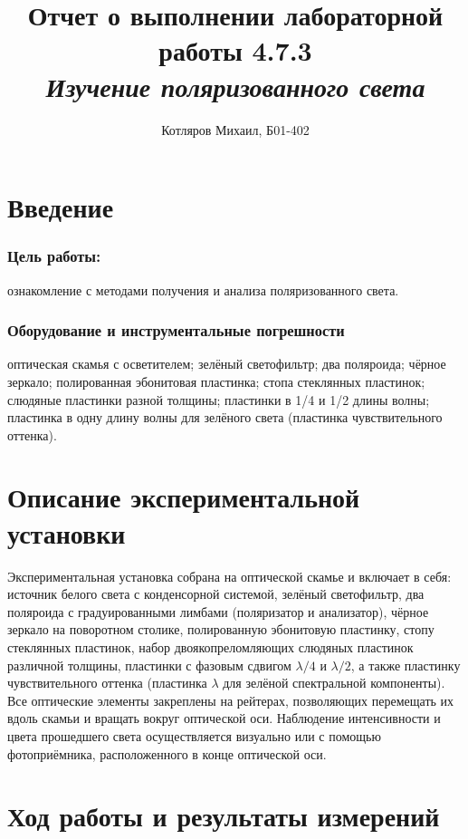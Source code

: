 \documentclass[a4paper]{article}
\title{\textbf{Отчет о выполнении лабораторной работы 4.7.3} \\[0.5em] \large\itshape Изучение поляризованного света}
\date{}
\author{Котляров Михаил, Б01-402}
\begin{document}
\maketitle
	
\section{Введение}

\subsubsection*{Цель работы:} ознакомление с методами получения и анализа
поляризованного света.

\subsubsection*{Оборудование и инструментальные погрешности}

оптическая скамья с осветителем; зелёный
светофильтр; два поляроида; чёрное зеркало; полированная эбонитовая пластинка;
стопа стеклянных пластинок; слюдяные пластинки разной толщины; пластинки в 1/4
и 1/2 длины волны; пластинка в одну длину волны для зелёного света (пластинка
чувствительного оттенка).


\section*{Описание экспериментальной установки}
Экспериментальная установка собрана на оптической скамье и включает в себя: источник белого света с конденсорной системой, зелёный светофильтр, два поляроида с градуированными лимбами (поляризатор и анализатор), чёрное зеркало на поворотном столике, полированную эбонитовую пластинку, стопу стеклянных пластинок, набор двоякопреломляющих слюдяных пластинок различной толщины, пластинки с фазовым сдвигом $\lambda/4$ и $\lambda/2$, а также пластинку чувствительного оттенка (пластинка $\lambda$ для зелёной спектральной компоненты). Все оптические элементы закреплены на рейтерах, позволяющих перемещать их вдоль скамьи и вращать вокруг оптической оси. Наблюдение интенсивности и цвета прошедшего света осуществляется визуально или с помощью фотоприёмника, расположенного в конце оптической оси.

\section*{Ход работы и результаты измерений}
\end{document}
